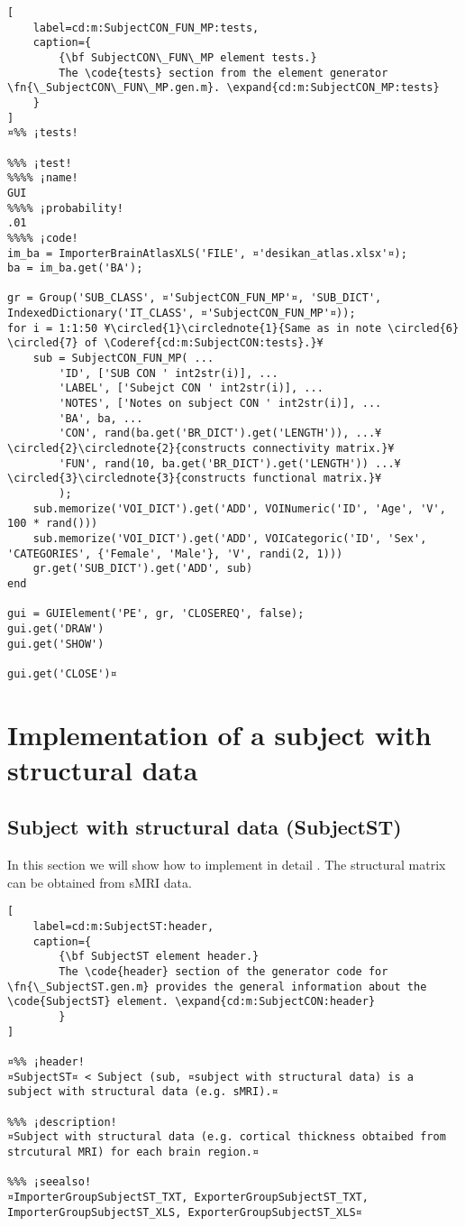 \documentclass{tufte-handout}
\begin{document}
\begin{lstlisting}[
	label=cd:m:SubjectCON_FUN_MP:tests,
	caption={
		{\bf SubjectCON\_FUN\_MP element tests.}
		The \code{tests} section from the element generator \fn{\_SubjectCON\_FUN\_MP.gen.m}. \expand{cd:m:SubjectCON_MP:tests}
	}
]
¤%% ¡tests!

%%% ¡test!
%%%% ¡name!
GUI
%%%% ¡probability!
.01
%%%% ¡code!
im_ba = ImporterBrainAtlasXLS('FILE', ¤'desikan_atlas.xlsx'¤);
ba = im_ba.get('BA');

gr = Group('SUB_CLASS', ¤'SubjectCON_FUN_MP'¤, 'SUB_DICT', IndexedDictionary('IT_CLASS', ¤'SubjectCON_FUN_MP'¤));
for i = 1:1:50 ¥\circled{1}\circlednote{1}{Same as in note \circled{6} \circled{7} of \Coderef{cd:m:SubjectCON:tests}.}¥
    sub = SubjectCON_FUN_MP( ...
        'ID', ['SUB CON ' int2str(i)], ...
        'LABEL', ['Subejct CON ' int2str(i)], ...
        'NOTES', ['Notes on subject CON ' int2str(i)], ...
        'BA', ba, ...
        'CON', rand(ba.get('BR_DICT').get('LENGTH')), ...¥\circled{2}\circlednote{2}{constructs connectivity matrix.}¥
        'FUN', rand(10, ba.get('BR_DICT').get('LENGTH')) ...¥\circled{3}\circlednote{3}{constructs functional matrix.}¥
        );
    sub.memorize('VOI_DICT').get('ADD', VOINumeric('ID', 'Age', 'V', 100 * rand()))
    sub.memorize('VOI_DICT').get('ADD', VOICategoric('ID', 'Sex', 'CATEGORIES', {'Female', 'Male'}, 'V', randi(2, 1)))
    gr.get('SUB_DICT').get('ADD', sub)
end

gui = GUIElement('PE', gr, 'CLOSEREQ', false);
gui.get('DRAW')
gui.get('SHOW')

gui.get('CLOSE')¤
\end{lstlisting}

\clearpage
\section{Implementation of a subject with structural data}

\subsection{Subject with structural data (SubjectST)}

In this section we will show how to implement in detail . The structural matrix can be obtained from sMRI data.

\begin{lstlisting}[
	label=cd:m:SubjectST:header,
	caption={
		{\bf SubjectST element header.}
		The \code{header} section of the generator code for \fn{\_SubjectST.gen.m} provides the general information about the \code{SubjectST} element. \expand{cd:m:SubjectCON:header}
		}
]

¤%% ¡header!
¤SubjectST¤ < Subject (sub, ¤subject with structural data) is a subject with structural data (e.g. sMRI).¤

%%% ¡description!
¤Subject with structural data (e.g. cortical thickness obtaibed from strcutural MRI) for each brain region.¤

%%% ¡seealso!
¤ImporterGroupSubjectST_TXT, ExporterGroupSubjectST_TXT, ImporterGroupSubjectST_XLS, ExporterGroupSubjectST_XLS¤
\end{lstlisting}
\end{document}
